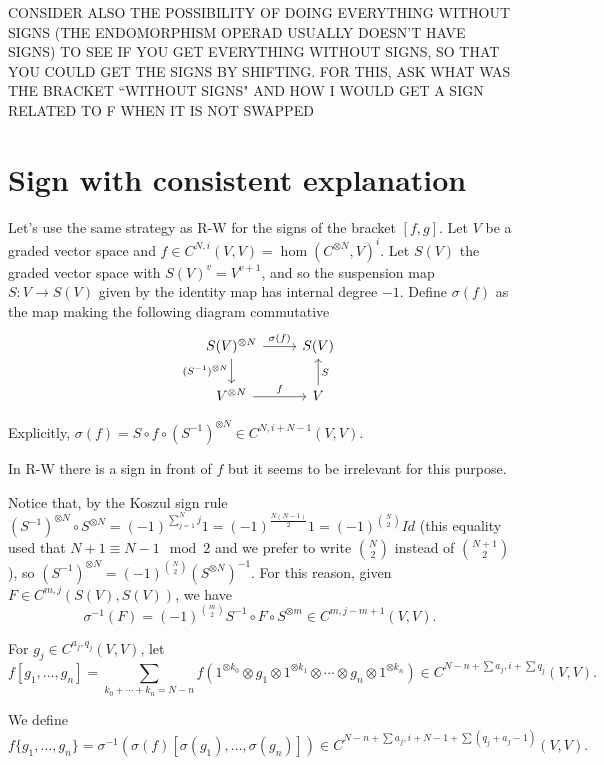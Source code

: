 \documentclass[twoside]{article}
\begin{document}
CONSIDER ALSO THE POSSIBILITY OF DOING EVERYTHING WITHOUT SIGNS (THE ENDOMORPHISM OPERAD USUALLY DOESN'T HAVE SIGNS) TO SEE IF YOU GET EVERYTHING WITHOUT SIGNS, SO THAT YOU COULD GET THE SIGNS BY SHIFTING. FOR THIS, ASK WHAT WAS THE BRACKET ``WITHOUT SIGNS" AND HOW I WOULD GET A SIGN RELATED TO F WHEN IT IS NOT SWAPPED

\section{Sign with consistent explanation}

Let's use the same strategy as R-W for the signs of the bracket $[f,g]$. Let $V$ be a graded vector space and $f\in C^{N,i}(V,V)=\hom(C^{\otimes N},V)^i$. Let $S(V)$ the graded vector space with $S(V)^v=V^{v+1}$, and so the suspension map $S:V\to S(V)$ given by the identity map has internal degree $-1$. Define $\sigma(f)$ as the map making the following diagram commutative
\[
\begin{tikzcd}
S(V)^{\otimes N}\arrow[r, "\sigma(f)"]\arrow[d, "(S^{-1})^{\otimes N}"'] & S(V)\\
V^{\otimes N}\arrow[r,"f"] & V\arrow[u, "S"']
\end{tikzcd}
\]

Explicitly, $\sigma(f)=S\circ f\circ (S^{-1})^{\otimes N}\in C^{N,i+N-1}(V,V)$. 

In R-W there is a sign in front of $f$ but it seems to be irrelevant for this purpose. 

Notice that, by the Koszul sign rule $(S^{-1})^{\otimes N}\circ S^{\otimes N}=(-1)^{\sum_{j=1}^N j}1=(-1)^{\frac{N(N-1)}{2}}1=(-1)^{\binom{N}{2}}Id$ (this equality used that $N+1\equiv N-1\mod 2$ and we prefer to write $\binom{N}{2}$ instead of $\binom{N+1}{2}$), so $(S^{-1})^{\otimes N}= (-1)^{\binom{N}{2}}(S^{\otimes N})^{-1}$. For this reason, given $F\in C^{m,j}(S(V),S(V))$, we have
\[
\sigma^{-1}(F)=(-1)^{\binom{m}{2}}S^{-1}\circ F\circ S^{\otimes m}\in C^{m,j-m+1}(V,V).
\]

For $g_j\in C^{a_j,q_j}(V,V)$, let $$f[g_1,\dots, g_n]=\sum_{k_0+\cdots+k_n=N-n}f(1^{\otimes k_0}\otimes g_1\otimes 1^{\otimes k_1}\otimes\cdots\otimes g_n\otimes 1^{\otimes k_n})\in C^{N-n+\sum a_j, i+\sum q_j}(V,V).$$

We define $f\{g_1,\dots, g_n\}=\sigma^{-1}(\sigma(f)[\sigma(g_1),\dots, \sigma(g_n)])\in C^{N-n+\sum a_j, i+N-1+\sum (q_j+a_j-1)}(V,V).$
\end{document}
